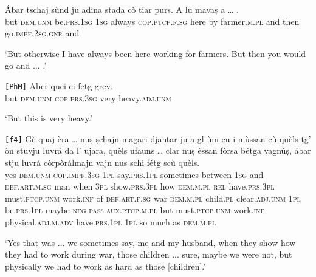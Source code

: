 \begin{linenumbers}
	\gll  Ábar tschaj sùnd ju adina stada cò tiar purs. A lu mavaṣ a … .  \\
	but \textsc{dem.unm} be.\textsc{prs.1sg} \textsc{1sg} always \textsc{cop.ptcp.f.sg} here by farmer.\textsc{m.pl} and then go.\textsc{impf.2sg.gnr} and\\
\end{linenumbers}
\medskip
\glt `But otherwise I have always been here working for farmers. But then you would go and ... .'
\medskip

\begin{linenumbers}
	\gll \texttt{[PhM]} Aber quei ei fetg grev.    \\
	{} but \textsc{dem.unm} \textsc{cop.prs.3sg} very heavy.\textsc{adj.unm}\\
\end{linenumbers}
\medskip
\glt `But this is very heavy.'
\medskip

\begin{linenumbers}
	\gll \texttt{[f4]} Gè quaj èra … nuṣ ṣchajn magari djantar ju a gl ùm cu i mùssan cù quèls tg’ òn stuvju luvrá da l’ ujara, quèls ufauns … clar nuṣ èssan fòrsa bétga vagnúṣ, ábar stju luvrá còrpòrálmajn vajn nus schi fétg scù quèls.\\
{}	yes \textsc{dem.unm} \textsc{cop.impf.3sg} {}  \textsc{1pl} say.\textsc{prs.1pl} sometimes between \textsc{1sg} and \textsc{def.art.m.sg} man when \textsc{3pl} show.\textsc{prs.3pl} how \textsc{dem.m.pl} \textsc{rel} have.\textsc{prs.3pl} must.\textsc{ptcp.unm} work.\textsc{inf} of \textsc{def.art.f.sg} war \textsc{dem.m.pl} child.\textsc{pl} {} clear\textsc{.adj.unm} \textsc{1pl} be.\textsc{prs.1pl} maybe \textsc{neg} \textsc{pass.aux.ptcp.m.pl} but must.\textsc{ptcp.unm} work.\textsc{inf} physical.\textsc{adj.m.adv} have.\textsc{prs.1pl} \textsc{1pl} so much as \textsc{dem.m.pl}\\
\end{linenumbers}
\medskip
\glt `Yes that was ... we sometimes say, me and my husband, when they show how they had to work during war, those children ... sure, maybe we were not, but physically we had to work as hard as those [children].'
\medskip

